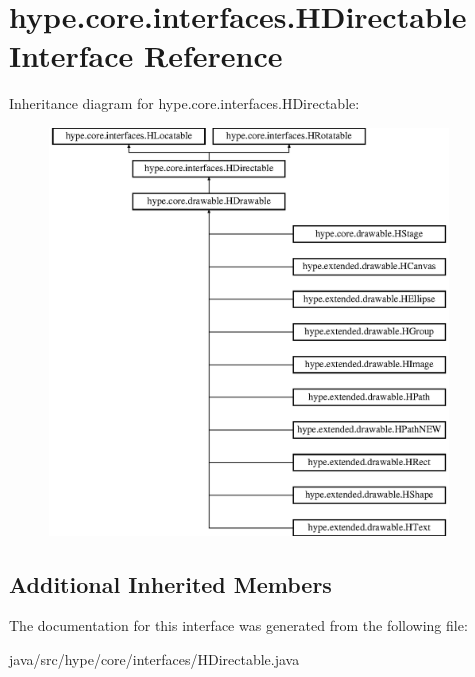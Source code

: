 \hypertarget{interfacehype_1_1core_1_1interfaces_1_1_h_directable}{\section{hype.\-core.\-interfaces.\-H\-Directable Interface Reference}
\label{interfacehype_1_1core_1_1interfaces_1_1_h_directable}
}
Inheritance diagram for hype.\-core.\-interfaces.\-H\-Directable\-:\begin{figure}[H]
\begin{center}
\leavevmode
\includegraphics[height=10.785185cm]{interfacehype_1_1core_1_1interfaces_1_1_h_directable}
\end{center}
\end{figure}
\subsection*{Additional Inherited Members}


The documentation for this interface was generated from the following file\-:\begin{DoxyCompactItemize}
\item 
java/src/hype/core/interfaces/H\-Directable.\-java\end{DoxyCompactItemize}
